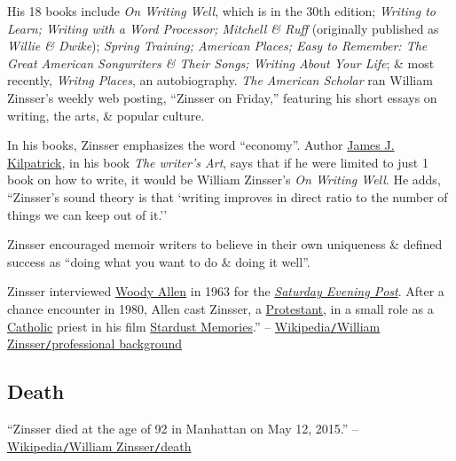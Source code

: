 \documentclass[oneside]{book}
\numberwithin{equation}{section}
\begin{document}
His 18 books include \textit{On Writing Well}, which is in the 30th edition; \textit{Writing to Learn; Writing with a Word Processor; Mitchell \& Ruff} (originally published as \textit{Willie \& Dwike}); \textit{Spring Training; American Places; Easy to Remember: The Great American Songwriters \& Their Songs; Writing About Your Life}; \& most recently, \textit{Writng Places}, an autobiography. \textit{The American Scholar} ran William Zinsser's weekly web posting, ``Zinsser on Friday,'' featuring his short essays on writing, the arts, \& popular culture.

In his books, Zinsser emphasizes the word ``economy''. Author \href{https://en.wikipedia.org/wiki/James_J._Kilpatrick}{James J. Kilpatrick}, in his book \textit{The writer's Art}, says that if he were limited to just 1 book on how to write, it would be William Zinsser's \textit{On Writing Well}. He adds, ``Zinsser's sound theory is that `writing improves in direct ratio to the number of things we can keep out of it.''

Zinsser encouraged memoir writers to believe in their own uniqueness \& defined success as ``doing what you want to do \& doing it well''.

Zinsser interviewed \href{https://en.wikipedia.org/wiki/Woody_Allen}{Woody Allen} in 1963 for the \href{https://en.wikipedia.org/wiki/Saturday_Evening_Post}{\textit{Saturday Evening Post}}. After a chance encounter in 1980, Allen cast Zinsser, a \href{https://en.wikipedia.org/wiki/Protestant}{Protestant}, in a small role as a \href{https://en.wikipedia.org/wiki/Catholic}{Catholic} priest in his film \href{https://en.wikipedia.org/wiki/Stardust_Memories}{Stardust Memories}.'' -- \href{https://en.wikipedia.org/wiki/William_Zinsser#Professional_background}{Wikipedia\texttt{/}William Zinsser\texttt{/}professional background}

\subsection{Death}
``Zinsser died at the age of 92 in Manhattan on May 12, 2015.'' -- \href{https://en.wikipedia.org/wiki/William_Zinsser#Death}{Wikipedia\texttt{/}William Zinsser\texttt{/}death}

\end{document}
